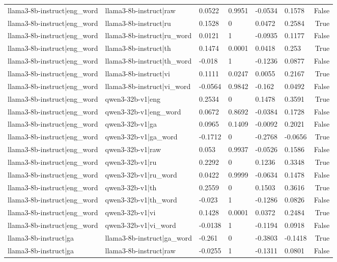\begin{table}
\begin{tabular}{llllllr}
llama3-8b-instruct|eng_word & llama3-8b-instruct|raw & 0.0522 & 0.9951 & -0.0534 & 0.1578 & False \\
llama3-8b-instruct|eng_word & llama3-8b-instruct|ru & 0.1528 & 0 & 0.0472 & 0.2584 & True \\
llama3-8b-instruct|eng_word & llama3-8b-instruct|ru_word & 0.0121 & 1 & -0.0935 & 0.1177 & False \\
llama3-8b-instruct|eng_word & llama3-8b-instruct|th & 0.1474 & 0.0001 & 0.0418 & 0.253 & True \\
llama3-8b-instruct|eng_word & llama3-8b-instruct|th_word & -0.018 & 1 & -0.1236 & 0.0877 & False \\
llama3-8b-instruct|eng_word & llama3-8b-instruct|vi & 0.1111 & 0.0247 & 0.0055 & 0.2167 & True \\
llama3-8b-instruct|eng_word & llama3-8b-instruct|vi_word & -0.0564 & 0.9842 & -0.162 & 0.0492 & False \\
llama3-8b-instruct|eng_word & qwen3-32b-v1|eng & 0.2534 & 0 & 0.1478 & 0.3591 & True \\
llama3-8b-instruct|eng_word & qwen3-32b-v1|eng_word & 0.0672 & 0.8692 & -0.0384 & 0.1728 & False \\
llama3-8b-instruct|eng_word & qwen3-32b-v1|ga & 0.0965 & 0.1409 & -0.0092 & 0.2021 & False \\
llama3-8b-instruct|eng_word & qwen3-32b-v1|ga_word & -0.1712 & 0 & -0.2768 & -0.0656 & True \\
llama3-8b-instruct|eng_word & qwen3-32b-v1|raw & 0.053 & 0.9937 & -0.0526 & 0.1586 & False \\
llama3-8b-instruct|eng_word & qwen3-32b-v1|ru & 0.2292 & 0 & 0.1236 & 0.3348 & True \\
llama3-8b-instruct|eng_word & qwen3-32b-v1|ru_word & 0.0422 & 0.9999 & -0.0634 & 0.1478 & False \\
llama3-8b-instruct|eng_word & qwen3-32b-v1|th & 0.2559 & 0 & 0.1503 & 0.3616 & True \\
llama3-8b-instruct|eng_word & qwen3-32b-v1|th_word & -0.023 & 1 & -0.1286 & 0.0826 & False \\
llama3-8b-instruct|eng_word & qwen3-32b-v1|vi & 0.1428 & 0.0001 & 0.0372 & 0.2484 & True \\
llama3-8b-instruct|eng_word & qwen3-32b-v1|vi_word & -0.0138 & 1 & -0.1194 & 0.0918 & False \\
llama3-8b-instruct|ga & llama3-8b-instruct|ga_word & -0.261 & 0 & -0.3803 & -0.1418 & True \\
llama3-8b-instruct|ga & llama3-8b-instruct|raw & -0.0255 & 1 & -0.1311 & 0.0801 & False \\

\end{tabular}
\end{table}
